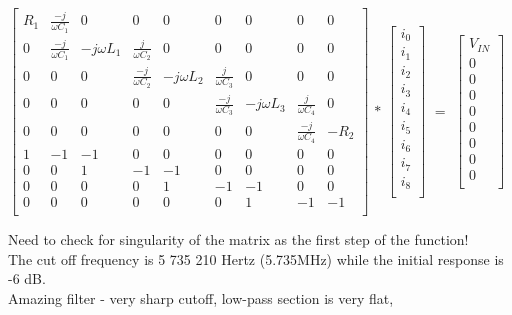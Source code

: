 \documentclass[11pt,a4paper]{article}
\begin{document}
$\begin{bmatrix*}
	R_{1} & \frac{-j}{\omega C_{1}} & 0 & 0 & 0 & 0 & 0 & 0 & 0 \\
	0 & \frac{-j}{\omega C_{1}} & -j \omega L_{1} & \frac{j}{\omega C_{2}} & 0 & 0 & 0 & 0 & 0\\
	0 & 0 &  0 & \frac{-j}{\omega C_{2}} & -j \omega L_{2} & \frac{j}{\omega C_{3}} & 0 & 0 & 0\\
	0 & 0 & 0 & 0 & 0 & \frac{-j}{\omega C_{3}} & -j \omega L_{3} & \frac{j}{\omega C_{4}} & 0\\
	0 & 0 & 0 & 0 & 0 & 0 & 0 & \frac{-j}{\omega C_{4}} & -R_{2}\\
	1 & -1 & -1 & 0 & 0 & 0 & 0 & 0 & 0\\
	0 & 0 & 1 & -1 & -1 & 0 & 0 & 0 & 0\\
	0 & 0 & 0 & 0 & 1 & -1 & -1 & 0 & 0\\
	0 & 0 & 0 & 0 & 0 & 0 & 1 & -1 & -1\\
\end{bmatrix*}$
$ * $
$\begin{bmatrix}
	i_{0}\\
	i_{1}\\
	i_{2}\\
	i_{3}\\
	i_{4}\\
	i_{5}\\
	i_{6}\\
	i_{7}\\
	i_{8}\\
\end{bmatrix}$ 
$ = $
$\begin{bmatrix}
	V_{IN}\\
	0\\
	0\\
	0\\
	0\\
	0\\
	0\\
	0\\
	0\\
\end{bmatrix}$

Need to check for singularity of the matrix as the first step of the function!\\

The cut off frequency is  5 735 210 Hertz (5.735MHz) while the initial response is -6 dB.\\
Amazing filter - very sharp cutoff, low-pass section is very flat,
\end{document}
